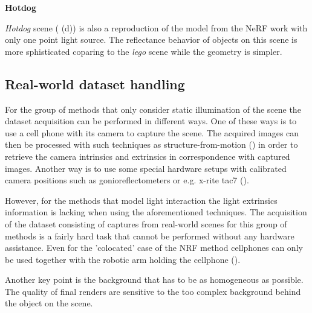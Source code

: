 \textbf{Hotdog}

\textit{Hotdog} scene ( (d)) is also a reproduction of the model
from the NeRF work with only one point light source.
The reflectance behavior of objects on this scene is more sphisticated
coparing to the \textit{lego} scene while the geometry is simpler.


\subsection{Real-world dataset handling}

For the group of methods that only consider static illumination of the scene
the dataset acquisition can be performed in different ways.
One of these ways is to use a cell phone with its camera to capture the scene.
The acquired images can then be processed with such techniques as
structure-from-motion (\cite{Moulon2012, Jancosek2011, schoenberger2016structure})
in order to retrieve the camera intrinsics and extrinsics in correspondence with captured images.
Another way is to use some special hardware setups with calibrated camera positions
such as gonioreflectometers or e.g. x-rite tac7 (\cite{merzbach2017highquality}).

However, for the methods that model light interaction the light extrinsics information is lacking
when using the aforementioned techniques.
The acquisition of the dataset consisting of captures from real-world scenes
for this group of methods is a fairly hard task that cannot be performed without any hardware assistance.
Even for the 'colocated' case of the NRF method cellphones can only be used
together with the robotic arm holding the cellphone (\cite{bi2020neural}).

Another key point is the background that has to be as homogeneous as possible.
The quality of final renders are sensitive to the too complex background behind the object on the scene.





